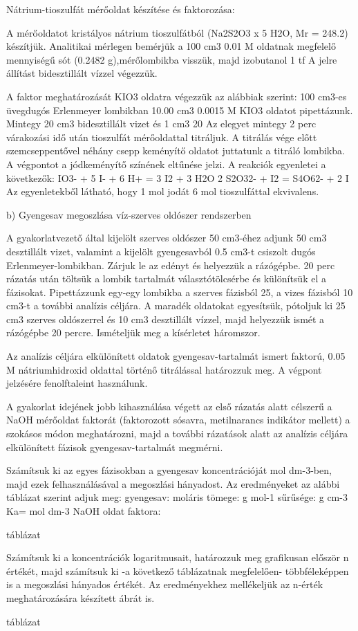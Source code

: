 Nátrium-tioszulfát mérőoldat készítése és faktorozása:

A mérőoldatot kristályos nátrium tioszulfátból (Na2S2O3 x 5 H2O, Mr = 248.2) készítjük.
Analitikai mérlegen bemérjük a 100 cm3 0.01 M oldatnak megfelelő mennyiségű sót (0.2482 g),mérőlombikba visszük, majd izobutanol 1 tf%
A jelre állítást bidesztillált vízzel végezzük.

A faktor meghatározását KIO3 oldatra végezzük az alábbiak szerint: 100 cm3-es üvegdugós Erlenmeyer lombikban 10.00 cm3 0.0015 M KIO3 oldatot pipettázunk.
Mintegy 20 cm3 bidesztillált vizet és 1 cm3 20%
Az elegyet mintegy 2 perc várakozási idő után tioszulfát mérőoldattal titráljuk.
A titrálás vége előtt szemcseppentővel néhány csepp keményítő oldatot juttatunk a titráló lombikba.
A végpontot a jódkeményítő színének eltűnése jelzi.
A reakciók egyenletei a következők:
IO3- + 5 I- + 6 H+ = 3 I2 + 3 H2O
2 S2O32- + I2 = S4O62- + 2 I
Az egyenletekből látható, hogy 1 mol jodát 6 mol tioszulfáttal ekvivalens.


b) Gyengesav megoszlása víz-szerves oldószer rendszerben

A gyakorlatvezető által kijelölt szerves oldószer 50 cm3-éhez adjunk 50 cm3 desztillált vizet, valamint a kijelölt gyengesavból 0.5 cm3-t csiszolt dugós Erlenmeyer-lombikban.
Zárjuk le az edényt és helyezzük a rázógépbe.
20 perc rázatás után töltsük a lombik tartalmát választótölcsérbe és különítsük el a fázisokat.
Pipettázzunk egy-egy lombikba a szerves fázisból 25, a vizes fázisból 10 cm3-t a további analízis céljára.
A maradék oldatokat egyesítsük, pótoljuk ki 25 cm3 szerves oldószerrel és 10 cm3 desztillált vízzel, majd helyezzük ismét a rázógépbe 20 percre.
Ismételjük meg a kísérletet háromszor.


Az analízis céljára elkülönített oldatok gyengesav-tartalmát ismert faktorú, 0.05 M nátriumhidroxid oldattal történő titrálással határozzuk meg.
A végpont jelzésére fenolftaleint használunk.

A gyakorlat idejének jobb kihasználása végett az első rázatás alatt célszerű a NaOH mérőoldat faktorát (faktorozott sósavra, metilnarancs indikátor mellett) a szokásos módon meghatározni, majd a további rázatások alatt az analízis céljára elkülönített fázisok gyengesav-tartalmát megmérni.

Számítsuk ki az egyes fázisokban a gyengesav koncentrációját mol dm-3-ben, majd ezek felhasználásával a megoszlási hányadost.
Az eredményeket az alábbi táblázat szerint adjuk meg:
gyengesav: moláris tömege: g mol-1
sűrűsége: g cm-3 Ka= mol dm-3
NaOH oldat faktora:

táblázat

Számítsuk ki a koncentrációk logaritmusait, határozzuk meg grafikusan először n értékét, majd számítsuk ki -a következő táblázatnak megfelelően- többféleképpen is a megoszlási hányados értékét.
Az eredményekhez mellékeljük az n-érték meghatározására készített ábrát is.

táblázat
